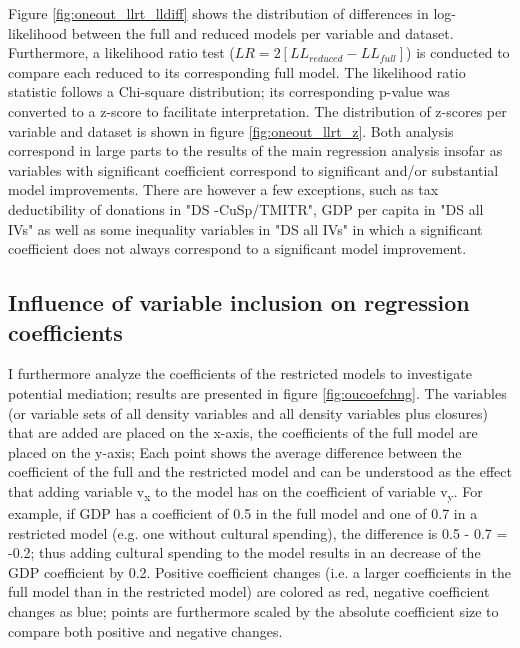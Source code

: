 \documentclass[11pt]{article}
\begin{document}
Figure \ref{fig:oneout_llrt_lldiff} shows the distribution of differences in log-likelihood between the full and reduced models per variable and dataset.
Furthermore, a likelihood ratio test (\(LR = 2[LL_{reduced} - LL_{full}]\)) is conducted to compare each reduced to its corresponding full model.
The likelihood ratio statistic follows a Chi-square distribution; its corresponding p-value was converted to a z-score to facilitate interpretation.
The distribution of z-scores per variable and dataset is shown in figure \ref{fig:oneout_llrt_z}.
Both analysis correspond in large parts to the results of the main regression analysis insofar as variables with significant coefficient correspond to significant and/or substantial model improvements.
There are however a few exceptions, such as tax deductibility of donations in "DS -CuSp/TMITR", GDP per capita in "DS all IVs" as well as some inequality variables in "DS all IVs" in which a significant coefficient does not always correspond to a significant model improvement. 

\FloatBarrier



\subsection{Influence of variable inclusion on regression coefficients}
\label{app_mediation}
I furthermore analyze the coefficients of the restricted models to investigate potential mediation; results are presented in figure \ref{fig:oucoefchng}.
The variables (or variable sets of all density variables and all density variables plus closures) that are added are placed on the x-axis, the coefficients of the full model are placed on the y-axis;
Each point shows the average difference between the coefficient of the full and the restricted model and can be understood as the effect that adding variable v\textsubscript{x} to the model has on the coefficient of variable v\textsubscript{y}.
For example, if GDP has a coefficient of 0.5 in the full model and one of 0.7 in a restricted model (e.g. one without cultural spending), the difference is 0.5 - 0.7 = -0.2; thus adding cultural spending to the model results in an decrease of the GDP coefficient by 0.2. 
Positive coefficient changes (i.e. a larger coefficients in the full model than in the restricted model) are colored as red, negative coefficient changes as blue; points are furthermore scaled by the absolute coefficient size to compare both positive and negative changes. 
\end{document}
